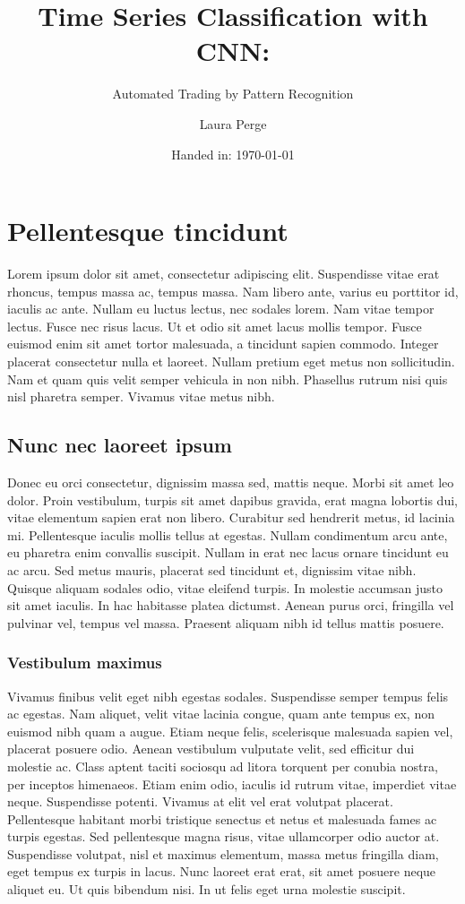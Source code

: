 \documentclass[11pt, a4paper]{article}
\author{Laura Perge}
\title{Time Series Classification with CNN:}
\subtitle{ Automated Trading by Pattern Recognition}
\date{Handed in: \today}
\begin{document}
\maketitle

\tableofcontents

\section{Pellentesque tincidunt}
Lorem ipsum dolor sit amet, consectetur adipiscing elit. Suspendisse vitae erat rhoncus, tempus massa ac, tempus massa. Nam libero ante, varius eu porttitor id, iaculis ac ante. Nullam eu luctus lectus, nec sodales lorem. Nam vitae tempor lectus. Fusce nec risus lacus. Ut et odio sit amet lacus mollis tempor. Fusce euismod enim sit amet tortor malesuada, a tincidunt sapien commodo. Integer placerat consectetur nulla et laoreet. Nullam pretium eget metus non sollicitudin. Nam et quam quis velit semper vehicula in non nibh. Phasellus rutrum nisi quis nisl pharetra semper. Vivamus vitae metus nibh.

\subsection{Nunc nec laoreet ipsum}
Donec eu orci consectetur, dignissim massa sed, mattis neque. Morbi sit amet leo dolor. Proin vestibulum, turpis sit amet dapibus gravida, erat magna lobortis dui, vitae elementum sapien erat non libero. Curabitur sed hendrerit metus, id lacinia mi. Pellentesque iaculis mollis tellus at egestas. Nullam condimentum arcu ante, eu pharetra enim convallis suscipit. Nullam in erat nec lacus ornare tincidunt eu ac arcu. Sed metus mauris, placerat sed tincidunt et, dignissim vitae nibh. Quisque aliquam sodales odio, vitae eleifend turpis. In molestie accumsan justo sit amet iaculis. In hac habitasse platea dictumst. Aenean purus orci, fringilla vel pulvinar vel, tempus vel massa. Praesent aliquam nibh id tellus mattis posuere.

\subsubsection{Vestibulum maximus}
Vivamus finibus velit eget nibh egestas sodales. Suspendisse semper tempus felis ac egestas. Nam aliquet, velit vitae lacinia congue, quam ante tempus ex, non euismod nibh quam a augue. Etiam neque felis, scelerisque malesuada sapien vel, placerat posuere odio. Aenean vestibulum vulputate velit, sed efficitur dui molestie ac. Class aptent taciti sociosqu ad litora torquent per conubia nostra, per inceptos himenaeos. Etiam enim odio, iaculis id rutrum vitae, imperdiet vitae neque. Suspendisse potenti. Vivamus at elit vel erat volutpat placerat. Pellentesque habitant morbi tristique senectus et netus et malesuada fames ac turpis egestas. Sed pellentesque magna risus, vitae ullamcorper odio auctor at. Suspendisse volutpat, nisl et maximus elementum, massa metus fringilla diam, eget tempus ex turpis in lacus. Nunc laoreet erat erat, sit amet posuere neque aliquet eu. Ut quis bibendum nisi. In ut felis eget urna molestie suscipit.
\end{document}
